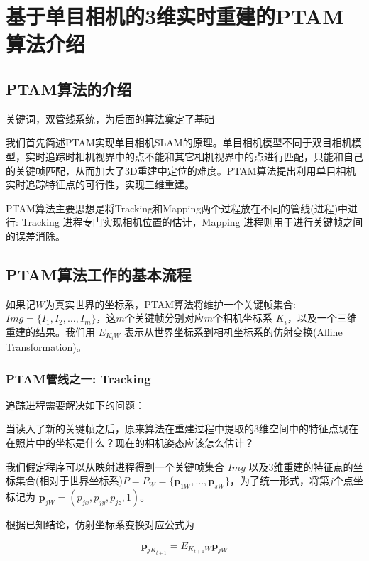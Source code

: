 
\def \R2{\mathbb{R}^2}
\def \R3{\mathbb{R}^3}
\def \Rn{\mathbb{R}^n}

\def \itW{\mathit{W}}

\def \itK{\mathit{K}}
\def \bfp{\mathbf{p}}

\chapter{基于单目相机的3维实时重建的PTAM算法介绍}


\section{PTAM算法的介绍}
关键词，双管线系统，为后面的算法奠定了基础

我们首先简述PTAM实现单目相机SLAM的原理。单目相机模型不同于双目相机模型，实时追踪时相机视界中的点不能和其它相机视界中的点进行匹配，只能和自己的关键帧匹配，从而加大了3D重建中定位的难度。PTAM算法提出利用单目相机实时追踪特征点的可行性，实现三维重建。

PTAM算法主要思想是将Tracking和Mapping两个过程放在不同的管线(进程)中进行: Tracking 进程专门实现相机位置的估计，Mapping 进程则用于进行关键帧之间的误差消除。

\section{PTAM算法工作的基本流程}
如果记$\itW$为真实世界的坐标系，PTAM算法将维护一个关键帧集合: $Img=\{I_1,I_2,\ldots,I_m\}$，这\(m\)个关键帧分别对应\(m\)个相机坐标系 $\itK_i$，以及一个三维重建的结果。我们用 $E_{\itK_i\itW}$ 表示从世界坐标系到相机坐标系的仿射变换(Affine Transformation)。


\subsection{PTAM管线之一: Tracking}


追踪进程需要解决如下的问题：

当读入了新的关键帧之后，原来算法在重建过程中提取的3维空间中的特征点现在在照片中的坐标是什么？现在的相机姿态应该怎么估计？ 

我们假定程序可以从映射进程得到一个关键帧集合 $Img$ 以及3维重建的特征点的坐标集合(相对于世界坐标系)$P=P_\itW=\{\bfp_{1\itW},\ldots,\bfp_{s\itW}\}$，为了统一形式，将第$j$个点坐标记为 $\bfp_{j\itW}= (p_{jx},p_{jy},p_{jz},1)$。

根据已知结论，仿射坐标系变换对应公式为

\begin{equation}
\bfp_{jK_{t+1}}= E_{K_{t+1}\itW} \bfp_{j\itW}
\end{equation}

